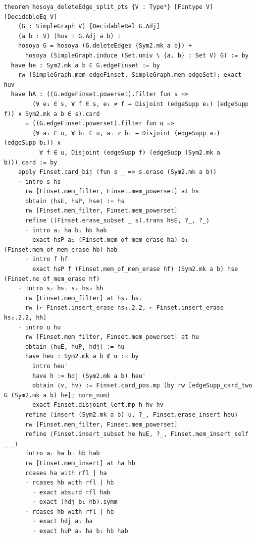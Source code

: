 \documentclass[11pt]{article}
\theoremstyle{definition}
\begin{document}
\begin{lstlisting}[caption={General lemma, verbatim head of
\texttt{attempts/phase0/r2/split-identity.lean} lines 215--259 (declaration
and first half of the proof).},label={lst:s2}]
theorem hosoya_deleteEdge_split_pts {V : Type*} [Fintype V] [DecidableEq V]
    (G : SimpleGraph V) [DecidableRel G.Adj]
    (a b : V) (huv : G.Adj a b) :
    hosoya G = hosoya (G.deleteEdges {Sym2.mk a b}) +
      hosoya (SimpleGraph.induce (Set.univ \ {a, b} : Set V) G) := by
  have he : Sym2.mk a b ∈ G.edgeFinset := by
    rw [SimpleGraph.mem_edgeFinset, SimpleGraph.mem_edgeSet]; exact huv
  have hA : ((G.edgeFinset.powerset).filter fun s =>
        (∀ e₁ ∈ s, ∀ f ∈ s, e₁ ≠ f → Disjoint (edgeSupp e₁) (edgeSupp f)) ∧ Sym2.mk a b ∈ s).card
      = ((G.edgeFinset.powerset).filter fun u =>
        (∀ a₁ ∈ u, ∀ b₁ ∈ u, a₁ ≠ b₁ → Disjoint (edgeSupp a₁) (edgeSupp b₁)) ∧
          ∀ f ∈ u, Disjoint (edgeSupp f) (edgeSupp (Sym2.mk a b))).card := by
    apply Finset.card_bij (fun s _ => s.erase (Sym2.mk a b))
    · intro s hs
      rw [Finset.mem_filter, Finset.mem_powerset] at hs
      obtain ⟨hsE, hsP, hse⟩ := hs
      rw [Finset.mem_filter, Finset.mem_powerset]
      refine ⟨(Finset.erase_subset _ s).trans hsE, ?_, ?_⟩
      · intro a₁ ha b₁ hb hab
        exact hsP a₁ (Finset.mem_of_mem_erase ha) b₁ (Finset.mem_of_mem_erase hb) hab
      · intro f hf
        exact hsP f (Finset.mem_of_mem_erase hf) (Sym2.mk a b) hse (Finset.ne_of_mem_erase hf)
    · intro s₁ hs₁ s₂ hs₂ hh
      rw [Finset.mem_filter] at hs₁ hs₂
      rw [← Finset.insert_erase hs₁.2.2, ← Finset.insert_erase hs₂.2.2, hh]
    · intro u hu
      rw [Finset.mem_filter, Finset.mem_powerset] at hu
      obtain ⟨huE, huP, hdj⟩ := hu
      have heu : Sym2.mk a b ∉ u := by
        intro heu'
        have h := hdj (Sym2.mk a b) heu'
        obtain ⟨v, hv⟩ := Finset.card_pos.mp (by rw [edgeSupp_card_two G (Sym2.mk a b) he]; norm_num)
        exact Finset.disjoint_left.mp h hv hv
      refine ⟨insert (Sym2.mk a b) u, ?_, Finset.erase_insert heu⟩
      rw [Finset.mem_filter, Finset.mem_powerset]
      refine ⟨Finset.insert_subset he huE, ?_, Finset.mem_insert_self _ _⟩
      intro a₁ ha b₁ hb hab
      rw [Finset.mem_insert] at ha hb
      rcases ha with rfl | ha
      · rcases hb with rfl | hb
        · exact absurd rfl hab
        · exact (hdj b₁ hb).symm
      · rcases hb with rfl | hb
        · exact hdj a₁ ha
        · exact huP a₁ ha b₁ hb hab
\end{lstlisting}
\end{document}
